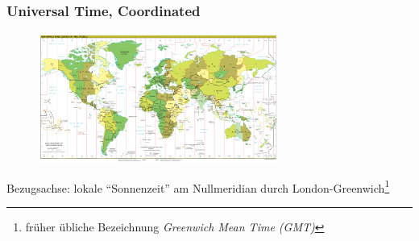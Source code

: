 \begin{frame}
  \frametitle{\textbf{U}niversal \textbf{T}ime, \textbf{C}oordinated}

  \begin{center}
    \begin{figure}
      \includegraphics[width=0.7\textwidth,height=.55\textheight,keepaspectratio]{bv13/Standard_time_zones_of_the_world.png}
    \end{figure}
  \end{center}

  Bezugsachse: lokale ``Sonnenzeit'' am Nullmeridian durch
    London-Greenwich\footnote{früher übliche Bezeichnung
    \emph{Greenwich Mean Time (GMT)}}

\end{frame}

